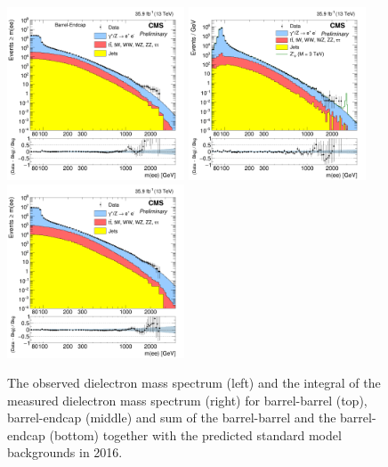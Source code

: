 \begin{figure}[!htbp]
\begin{center}
    \includegraphics[width=0.47\textwidth]{figures/Zprime/2016/mass/cMassHistEBEE}
    \includegraphics[width=0.47\textwidth]{figures/Zprime/2016/mass/massHist}
    \includegraphics[width=0.47\textwidth]{figures/Zprime/2016/mass/cMassHist}
    \caption{The observed dielectron mass spectrum (left) and the integral of the measured dielectron mass spectrum (right) for barrel-barrel (top), barrel-endcap (middle) and sum of the barrel-barrel and the barrel-endcap (bottom) together with the predicted standard model backgrounds in 2016.}
    \label{mass_2016}
  \end{center}
\end{figure}

